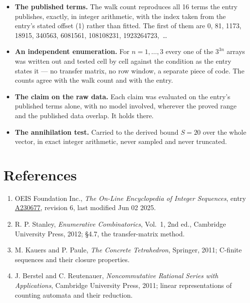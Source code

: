 \documentclass[11pt]{article}
\theoremstyle{definition}
\begin{document}
\begin{itemize}

\item {\bfseries The published terms.} The walk count reproduces all 16 terms the entry publishes, exactly, in integer arithmetic, with the index taken from the entry's stated offset (1) rather than fitted. The first of them are 0, 81, 1173, 18915, 340563, 6081561, 108108231, 1923264723,~\dots

\item {\bfseries An independent enumeration.} For $n = 1,\dots,3$ every one of the $3^{3n}$ arrays was written out and tested cell by cell against the condition as the entry states it --- no transfer matrix, no row window, a separate piece of code. The counts agree with the walk count and with the entry.

\item {\bfseries The claim on the raw data.} Each claim was evaluated on the entry's published terms alone, with no model involved, wherever the proved range and the published data overlap. It holds there.

\item {\bfseries The annihilation test.} Carried to the derived bound $S = 20$ over the whole vector, in exact integer arithmetic, never sampled and never truncated.

\end{itemize}

\section{References}

\begin{enumerate}

\item OEIS Foundation Inc., \emph{The On-Line Encyclopedia of Integer Sequences}, entry \href{https://oeis.org/A230677}{A230677}, revision 6, last modified Jun 02 2025.

\item R. P. Stanley, \emph{Enumerative Combinatorics}, Vol.~1, 2nd ed., Cambridge University Press, 2012; \S4.7, the transfer-matrix method.

\item M. Kauers and P. Paule, \emph{The Concrete Tetrahedron}, Springer, 2011; C-finite sequences and their closure properties.

\item J. Berstel and C. Reutenauer, \emph{Noncommutative Rational Series with Applications}, Cambridge University Press, 2011; linear representations of counting automata and their reduction.

\end{enumerate}
\end{document}
